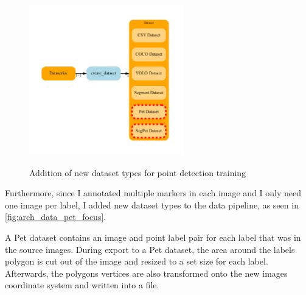 \documentclass[10pt]{book}
\begin{document}
\begin{figure}
  \caption{Addition of new dataset types for point detection training}
  \includegraphics[width=0.6\textwidth]{graph/arch_data_pet_focus}
  \label{fig:arch_data_pet_focus}
\end{figure}

Furthermore, since I annotated multiple markers in each image and I only need one image per label, I added new dataset types to the data pipeline, as seen in \autoref{fig:arch_data_pet_focus}. 

A Pet dataset contains an image and point label pair for each label that was in the source images. During export to a Pet dataset, the area around the labels polygon is cut out of the image and resized to a set size for each label. Afterwards, the polygons vertices are also transformed onto the new images coordinate system and written into a file. 
\end{document}

